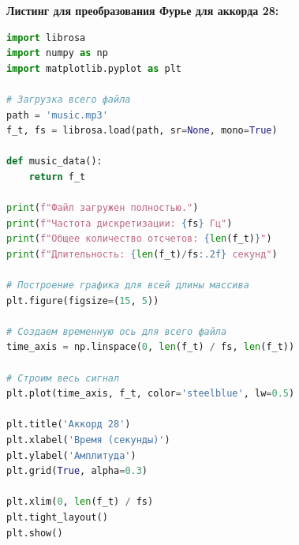 \documentclass[a4paper,12pt]{article}
\begin{document}
\textbf{Листинг для преобразования Фурье для аккорда 28:}
\begin{lstlisting}[label=lst:square_wave_grafic_building, language=Python, style=mystyle]
import librosa
import numpy as np
import matplotlib.pyplot as plt

# Загрузка всего файла
path = 'music.mp3'
f_t, fs = librosa.load(path, sr=None, mono=True)

def music_data():
    return f_t

print(f"Файл загружен полностью.")
print(f"Частота дискретизации: {fs} Гц")
print(f"Общее количество отсчетов: {len(f_t)}")
print(f"Длительность: {len(f_t)/fs:.2f} секунд")

# Построение графика для всей длины массива
plt.figure(figsize=(15, 5))

# Создаем временную ось для всего файла
time_axis = np.linspace(0, len(f_t) / fs, len(f_t))

# Строим весь сигнал
plt.plot(time_axis, f_t, color='steelblue', lw=0.5) 

plt.title('Аккорд 28')
plt.xlabel('Время (секунды)')
plt.ylabel('Амплитуда')
plt.grid(True, alpha=0.3)

plt.xlim(0, len(f_t) / fs)
plt.tight_layout()
plt.show()
\end{lstlisting}
\end{document}
